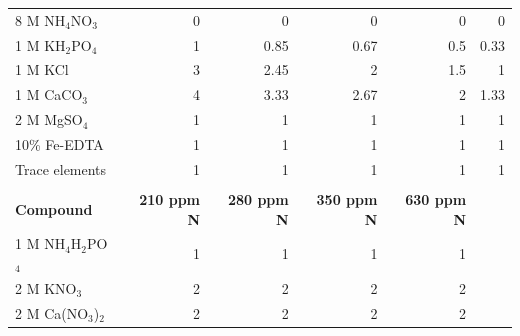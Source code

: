 \begin{table}[!h]
{\begin{tabular}{p{2.805cm}p{2cm}p{2cm}p{2cm}p{2cm}p{2cm}}
        8 M NH$_4$NO$_3$        & \multicolumn{1}{r}{0}         & \multicolumn{1}{r}{0}         & \multicolumn{1}{r}{0}         & \multicolumn{1}{r}{0}         & \multicolumn{1}{r}{0} \\
        1 M KH$_2$PO$_4$        & \multicolumn{1}{r}{1}         & \multicolumn{1}{r}{0.85}      & \multicolumn{1}{r}{0.67}      & \multicolumn{1}{r}{0.5}       & \multicolumn{1}{r}{0.33} \\
        1 M KCl                 & \multicolumn{1}{r}{3}         & \multicolumn{1}{r}{2.45}      & \multicolumn{1}{r}{2}         & \multicolumn{1}{r}{1.5}       & \multicolumn{1}{r}{1} \\
        1 M CaCO$_3$            & \multicolumn{1}{r}{4}         & \multicolumn{1}{r}{3.33}      & \multicolumn{1}{r}{2.67}      & \multicolumn{1}{r}{2}         & \multicolumn{1}{r}{1.33} \\
        2 M MgSO$_4$            & \multicolumn{1}{r}{1}         & \multicolumn{1}{r}{1}         & \multicolumn{1}{r}{1}         & \multicolumn{1}{r}{1}         & \multicolumn{1}{r}{1} \\
        10\% Fe-EDTA            & \multicolumn{1}{r}{1}         & \multicolumn{1}{r}{1}         & \multicolumn{1}{r}{1}         & \multicolumn{1}{r}{1}         & \multicolumn{1}{r}{1} \\
        Trace elements          & \multicolumn{1}{r}{1}         & \multicolumn{1}{r}{1}         & \multicolumn{1}{r}{1}         & \multicolumn{1}{r}{1}         & \multicolumn{1}{r}{1} \\
        \hline
        &&&&&
        \\
        \hline
        \textbf{Compound}
        & \multicolumn{1}{r}{\textbf{210 ppm N}}
        & \multicolumn{1}{r}{\textbf{280 ppm N}}
        & \multicolumn{1}{r}{\textbf{350 ppm N}}
        & \multicolumn{1}{r}{\textbf{630 ppm N}} &
        \\
        \hline
        1 M NH$_4$H$_2$PO$_4$   & \multicolumn{1}{r}{1}         & \multicolumn{1}{r}{1}         & \multicolumn{1}{r}{1}         & \multicolumn{1}{r}{1}         &   \\
        2 M KNO$_3$             & \multicolumn{1}{r}{2}         & \multicolumn{1}{r}{2}         & \multicolumn{1}{r}{2}         & \multicolumn{1}{r}{2}         &   \\
        2 M Ca(NO$_3$)$_2$      & \multicolumn{1}{r}{2}         & \multicolumn{1}{r}{2}         & \multicolumn{1}{r}{2}         & \multicolumn{1}{r}{2}         &   \\

\end{tabular}}
\end{table}
